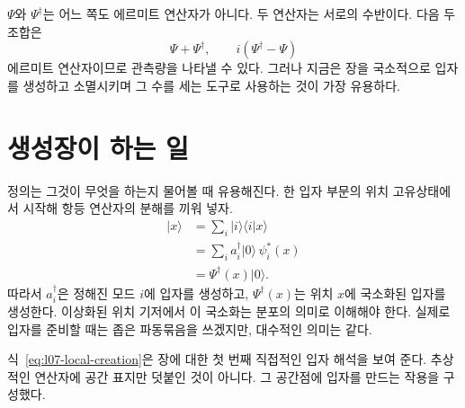 \(\Psi\)와 \(\Psi^\dagger\)는 어느 쪽도 에르미트 연산자가 아니다. 두 연산자는 서로의 수반이다. 다음 두 조합은
\begin{equation}
\Psi+\Psi^\dagger,
\qquad
i(\Psi^\dagger-\Psi)
\label{eq:l07-hermitian-combinations}
\end{equation}
에르미트 연산자이므로 관측량을 나타낼 수 있다. 그러나 지금은 장을 국소적으로 입자를 생성하고 소멸시키며 그 수를 세는 도구로 사용하는 것이 가장 유용하다.

\begin{classroomqa}
\end{classroomqa}

\section{생성장이 하는 일}

정의는 그것이 무엇을 하는지 물어볼 때 유용해진다. 한 입자 부문의 위치 고유상태에서 시작해 항등 연산자의 분해를 끼워 넣자.
\begin{align}
|x\rangle
&=\sum_i |i\rangle\langle i|x\rangle \\
&=\sum_i a_i^\dagger|0\rangle\,\psi_i^*(x) \\
&=\Psi^\dagger(x)|0\rangle.
\label{eq:l07-local-creation}
\end{align}
따라서 \(a_i^\dagger\)은 정해진 모드 \(i\)에 입자를 생성하고, \(\Psi^\dagger(x)\)는 위치 \(x\)에 국소화된 입자를 생성한다. 이상화된 위치 기저에서 이 국소화는 분포의 의미로 이해해야 한다. 실제로 입자를 준비할 때는 좁은 파동묶음을 쓰겠지만, 대수적인 의미는 같다.

\begin{classroomqa}
\end{classroomqa}

식~\eqref{eq:l07-local-creation}은 장에 대한 첫 번째 직접적인 입자 해석을 보여 준다. 추상적인 연산자에 공간 표지만 덧붙인 것이 아니다. 그 공간점에 입자를 만드는 작용을 구성했다.

